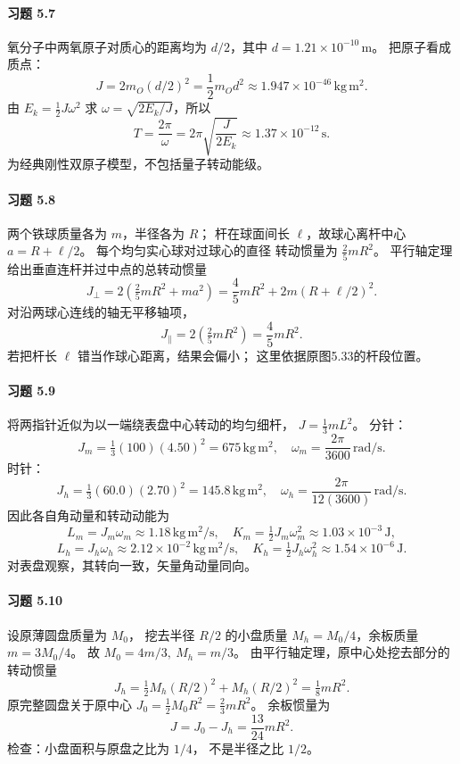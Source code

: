 \paragraph{习题 5.7}
氧分子中两氧原子对质心的距离均为
\(d/2\)，其中 \(d=1.21\times10^{-10}\,\mathrm m\)。
把原子看成质点：
\[
 \boxed{J=2m_O(d/2)^2=\frac12m_Od^2
 \approx1.947\times10^{-46}\,\mathrm{kg\,m^2}}.
\]
由 \(E_k=\tfrac12J\omega^2\) 求
\(\omega=\sqrt{2E_k/J}\)，所以
\[
 \boxed{T=\frac{2\pi}{\omega}
 =2\pi\sqrt{\frac{J}{2E_k}}
 \approx1.37\times10^{-12}\,\mathrm s}.
\]
为经典刚性双原子模型，不包括量子转动能级。

\paragraph{习题 5.8}
两个铁球质量各为 \(m\)，半径各为 \(R\)；
杆在球面间长 \(\ell\)，故球心离杆中心
\(a=R+\ell/2\)。
每个均匀实心球对过球心的直径
转动惯量为 \(\tfrac25mR^2\)。
平行轴定理给出垂直连杆并过中点的总转动惯量
\[
 \boxed{J_\perp
 =2\left(\tfrac25mR^2+ma^2\right)
 =\frac45mR^2+2m(R+\ell/2)^2}.
\]
对沿两球心连线的轴无平移轴项，
\[
 \boxed{J_\parallel=2(\tfrac25mR^2)=\frac45mR^2}.
\]
若把杆长 \(\ell\) 错当作球心距离，结果会偏小；
这里依据原图5.33的杆段位置。

\paragraph{习题 5.9}
将两指针近似为以一端绕表盘中心转动的均匀细杆，
\(J=\tfrac13mL^2\)。
分针：
\[
 J_m=\tfrac13(100)(4.50)^2=675\,\mathrm{kg\,m^2},
 \quad\omega_m=\frac{2\pi}{3600}\,\mathrm{rad/s}.
\]
时针：
\[
 J_h=\tfrac13(60.0)(2.70)^2=145.8\,\mathrm{kg\,m^2},
 \quad\omega_h=\frac{2\pi}{12(3600)}\,\mathrm{rad/s}.
\]
因此各自角动量和转动动能为
\[
 \boxed{L_m=J_m\omega_m\approx1.18\,\mathrm{kg\,m^2/s}},
 \quad \boxed{K_m=\tfrac12J_m\omega_m^2
 \approx1.03\times10^{-3}\,\mathrm J},
\]
\[
 \boxed{L_h=J_h\omega_h\approx2.12\times10^{-2}
 \,\mathrm{kg\,m^2/s}},\quad
 \boxed{K_h=\tfrac12J_h\omega_h^2
 \approx1.54\times10^{-6}\,\mathrm J}.
\]
对表盘观察，其转向一致，矢量角动量同向。

\paragraph{习题 5.10}
设原薄圆盘质量为 \(M_0\)，
挖去半径 \(R/2\) 的小盘质量
\(M_h=M_0/4\)，余板质量
\(m=3M_0/4\)。
故 \(M_0=4m/3,\ M_h=m/3\)。
由平行轴定理，原中心处挖去部分的转动惯量
\[
 J_h=\tfrac12M_h(R/2)^2+M_h(R/2)^2
 =\tfrac18mR^2.
\]
原完整圆盘关于原中心
\(J_0=\tfrac12M_0R^2=\tfrac23mR^2\)。
余板惯量为
\[
 \boxed{J=J_0-J_h=\frac{13}{24}mR^2}.
\]
检查：小盘面积与原盘之比为 \(1/4\)，
不是半径之比 \(1/2\)。


